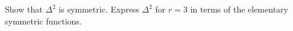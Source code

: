 Show that $\Delta^2$ is symmetric. Express $\Delta^2$ for $r = 3$ in terms of the elementary symmetric functions.